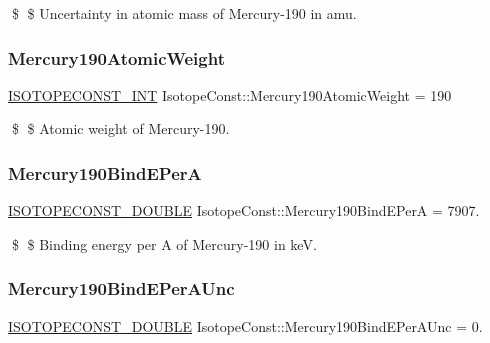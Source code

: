 \$ \$ Uncertainty in atomic mass of Mercury-\/190 in amu. \mbox{\label{group___isotope_const-_mercury-_hg190_ga59c4205979736ed26d1c50407512389d}} 
\subsubsection{\texorpdfstring{Mercury190\+Atomic\+Weight}{Mercury190AtomicWeight}}
{\footnotesize\ttfamily \mbox{\hyperlink{group___isotope_const-_macros_ga5f18360b3e99483a35c32d789e62621c}{I\+S\+O\+T\+O\+P\+E\+C\+O\+N\+S\+T\+\_\+\+I\+NT}} Isotope\+Const\+::\+Mercury190\+Atomic\+Weight = 190}

\$ \$ Atomic weight of Mercury-\/190. \mbox{\label{group___isotope_const-_mercury-_hg190_gadd1f0ebb7e2dd8a7e0d60166ecd80769}} 
\subsubsection{\texorpdfstring{Mercury190\+Bind\+E\+PerA}{Mercury190BindEPerA}}
{\footnotesize\ttfamily \mbox{\hyperlink{group___isotope_const-_macros_ga8f45a7272ce02c0b4c65c44636ed719a}{I\+S\+O\+T\+O\+P\+E\+C\+O\+N\+S\+T\+\_\+\+D\+O\+U\+B\+LE}} Isotope\+Const\+::\+Mercury190\+Bind\+E\+PerA = 7907.}

\$ \$ Binding energy per A of Mercury-\/190 in keV. \mbox{\label{group___isotope_const-_mercury-_hg190_gac5a468fbb88137c9ba5c8e356d6e8398}} 
\subsubsection{\texorpdfstring{Mercury190\+Bind\+E\+Per\+A\+Unc}{Mercury190BindEPerAUnc}}
{\footnotesize\ttfamily \mbox{\hyperlink{group___isotope_const-_macros_ga8f45a7272ce02c0b4c65c44636ed719a}{I\+S\+O\+T\+O\+P\+E\+C\+O\+N\+S\+T\+\_\+\+D\+O\+U\+B\+LE}} Isotope\+Const\+::\+Mercury190\+Bind\+E\+Per\+A\+Unc = 0.}

